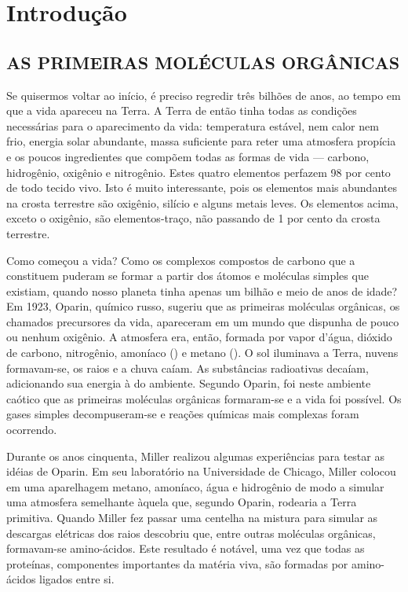\chapter{Introdução}

\section{AS PRIMEIRAS MOLÉCULAS ORGÂNICAS}

Se quisermos voltar ao início, é preciso regredir três bilhões de anos, ao tempo em que a vida apareceu na Terra. A Terra de então tinha todas as condições necessárias para o aparecimento da vida: temperatura estável, nem calor nem frio, energia solar abundante, massa suficiente para reter uma atmosfera propícia e os poucos ingredientes que compõem todas as formas de vida — carbono, hidrogênio, oxigênio e nitrogênio. Estes quatro elementos perfazem 98 por cento de todo tecido vivo. Isto é muito interessante, pois os elementos mais abundantes na crosta terrestre são oxigênio, silício e alguns metais leves. Os elementos acima, exceto o oxigênio, são elementos-traço, não passando de 1 por cento da crosta terrestre. 

Como começou a vida? Como os complexos compostos de carbono que a constituem puderam se formar a partir dos átomos e moléculas simples que existiam, quando nosso planeta tinha apenas um bilhão e meio de anos de idade? Em 1923, Oparin, químico russo, sugeriu que as primeiras moléculas orgânicas, os chamados precursores da vida, apareceram em um mundo que dispunha de pouco ou nenhum oxigênio. A atmosfera era, então, formada por vapor d'água, dióxido de carbono, nitrogênio, amoníaco () e metano (). O sol iluminava a Terra, nuvens formavam-se, os raios e a chuva caíam. As substâncias radioativas decaíam, adicionando sua energia à do ambiente. Segundo Oparin, foi neste ambiente caótico que as primeiras moléculas orgânicas formaram-se e a vida foi possível. Os gases simples decompuseram-se e reações químicas mais complexas foram ocorrendo. 

Durante os anos cinquenta, Miller realizou algumas experiências para testar as idéias de Oparin. Em seu laboratório na Universidade de Chicago, Miller colocou em uma aparelhagem metano, amoníaco, água e hidrogênio de modo a simular uma atmosfera semelhante àquela que, segundo Oparin, rodearia a Terra primitiva. Quando Miller fez passar uma centelha na mistura para simular as descargas elétricas dos raios descobriu que, entre outras moléculas orgânicas, formavam-se amino-ácidos. Este resultado é notável, uma vez que todas as proteínas, componentes importantes da matéria viva, são formadas por amino-ácidos ligados entre si. 

